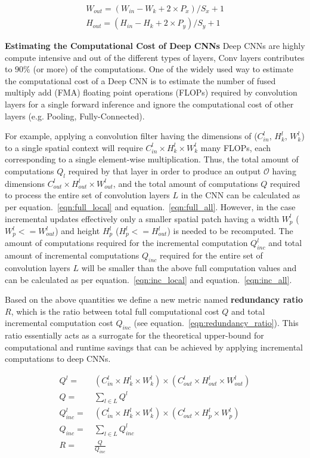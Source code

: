 \begin{align}
W_{out} = (W_{in} - W_k + 2\times P_x)/S_x + 1 \\
H_{out} = (H_{in} - H_k + 2\times P_y)/S_y + 1
\end{align}

\noindent \textbf{Estimating the Computational Cost of Deep CNNs}
Deep CNNs are highly compute intensive and out of the different types of layers, Conv layers contributes to $90\%$ (or more) of the computations. One of the widely used way to estimate the computational cost of a Deep CNN is to estimate the number of fused multiply add (FMA) floating point operations (FLOPs) required by convolution layers for a single forward inference and ignore the computational cost of other layers (e.g. Pooling, Fully-Connected).

For example, applying a convolution filter having the dimensions of ($C^l_{in}$, $H^l_{k}$, $W^l_{k}$) to a single spatial context will require $C^l_{in} \times H^l_{k} \times W^l_{k}$ many FLOPs, each corresponding to a single element-wise multiplication. Thus, the total amount of computations $Q_l$ required by that layer in order to produce an output $\mathcal{O}$ having dimensions $C^l_{out} \times H^l_{out} \times W^l_{out}$, and the total amount of computations $Q$ required to process the entire set of convolution layers $L$ in the CNN can be calculated as per equation.~\ref{eqn:full_local} and equation.~\ref{eqn:full_all}. However, in the case incremental updates effectively only a smaller spatial patch having a width $W^l_p$ ($W^l_p<=W^l_{out}$) and height $H^l_p$ ($H^l_p<=H^l_{out}$) is needed to be recomputed. The amount of computations required for the incremental computation $Q^l_{inc}$ and total amount of incremental computations $Q_{inc}$ required for the entire set of convolution layers $L$ will be smaller than the above full computation values and can be calculated as per equation.~\ref{eqn:inc_local} and equation.~\ref{eqn:inc_all}.

Based on the above quantities we define a new metric named \textbf{redundancy ratio} $R$, which is the ratio between total full computational cost $Q$ and total incremental computation cost $Q_{inc}$ (see equation.~\ref{eqn:redundancy_ratio}). This ratio essentially acts as a surrogate for the theoretical upper-bound for computational and runtime savings that can be achieved by applying incremental computations to deep CNNs.

\begin{align}
\label{eqn:full_local}
Q^l =&~ (C^l_{in} \times H^l_{k} \times W^l_{k}) \times (C^l_{out} \times H^l_{out} \times W^l_{out})\\
\label{eqn:full_all}
Q =&~ \sum_{l \in L} Q^l\\
\label{eqn:inc_local}
Q_{inc}^l =&~ (C^l_{in} \times H^l_{k} \times W^l_{k}) \times (C^l_{out} \times H^l_{p} \times W^l_{p})\\
\label{eqn:inc_all}
Q_{inc} =&~ \sum_{l \in L} Q^l_{inc}\\
\label{eqn:redundancy_ratio}
R =&~ \frac{Q}{Q_{inc}}
\end{align}


